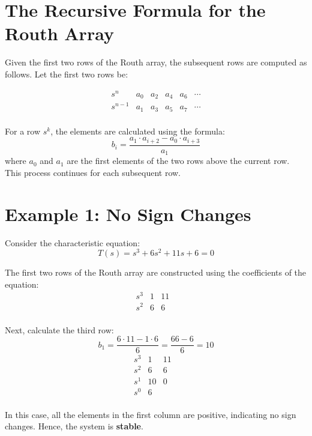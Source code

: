 \documentclass[a4paper,12pt]{article}
\begin{document}
\section{The Recursive Formula for the Routh Array}

Given the first two rows of the Routh array, the subsequent rows are computed as follows. Let the first two rows be:

\[
\begin{array}{c|ccccc}
s^n & a_0 & a_2 & a_4 & a_6 & \cdots \\
s^{n-1} & a_1 & a_3 & a_5 & a_7 & \cdots \\
\end{array}
\]

For a row \(s^k\), the elements are calculated using the formula:
\begin{equation}
b_i = \frac{a_1 \cdot a_{i+2} - a_0 \cdot a_{i+3}}{a_1}
\end{equation}
where \(a_0\) and \(a_1\) are the first elements of the two rows above the current row. This process continues for each subsequent row.

\section{Example 1: No Sign Changes}

Consider the characteristic equation:
\begin{equation}
T(s) = s^3 + 6s^2 + 11s + 6 = 0
\end{equation}

The first two rows of the Routh array are constructed using the coefficients of the equation:
\[
\begin{array}{c|ccc}
s^3 & 1 & 11 & \\
s^2 & 6 & 6 & \\
\end{array}
\]

Next, calculate the third row:
\[
b_1 = \frac{6 \cdot 11 - 1 \cdot 6}{6} = \frac{66 - 6}{6} = 10
\]
\[
\begin{array}{c|ccc}
s^3 & 1 & 11 & \\
s^2 & 6 & 6 & \\
s^1 & 10 & 0 & \\
s^0 & 6 & & \\
\end{array}
\]

In this case, all the elements in the first column are positive, indicating no sign changes. Hence, the system is \textbf{stable}.
\end{document}
